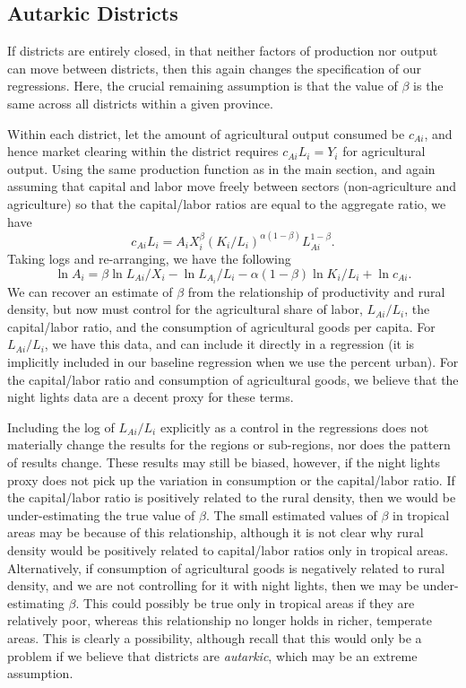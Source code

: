 \documentclass[11pt]{article}
\begin{document}
\subsection{Autarkic Districts}
If districts are entirely closed, in that neither factors of production nor output can move between districts, then this again changes the specification of our regressions. Here, the crucial remaining assumption is that the value of $\beta$ is the same across all districts within a given province. 

Within each district, let the amount of agricultural output consumed be $c_{Ai}$, and hence market clearing within the district requires $c_{Ai} L_i = Y_i$ for agricultural output. Using the same production function as in the main section, and again assuming that capital and labor move freely between sectors (non-agriculture and agriculture) so that the capital/labor ratios are equal to the aggregate ratio, we have
\begin{equation}
	c_{Ai} L_i = A_i X_i^{\beta} \left(K_i/L_i\right)^{\alpha(1-\beta)} L_{Ai}^{1-\beta}. \nonumber
\end{equation}
Taking logs and re-arranging, we have the following
\begin{equation}
	\ln A_i = \beta \ln L_{Ai}/X_i - \ln L_{A_i}/L_i - \alpha(1-\beta) \ln K_{i}/L_{i} + \ln c_{Ai}. \nonumber
\end{equation}
We can recover an estimate of $\beta$ from the relationship of productivity and rural density, but now must control for the agricultural share of labor, $L_{Ai}/L_i$, the capital/labor ratio, and the consumption of agricultural goods per capita. For $L_{Ai}/L_i$, we have this data, and can include it directly in a regression (it is implicitly included in our baseline regression when we use the percent urban). For the capital/labor ratio and consumption of agricultural goods, we believe that the night lights data are a decent proxy for these terms.

Including the log of $L_{Ai}/L_i$ explicitly as a control in the regressions does not materially change the results for the regions or sub-regions, nor does the pattern of results change. These results may still be biased, however, if the night lights proxy does not pick up the variation in consumption or the capital/labor ratio. If the capital/labor ratio is positively related to the rural density, then we would be under-estimating the true value of $\beta$. The small estimated values of $\beta$ in tropical areas may be because of this relationship, although it is not clear why rural density would be positively related to capital/labor ratios only in tropical areas. Alternatively, if consumption of agricultural goods is negatively related to rural density, and we are not controlling for it with night lights, then we may be under-estimating $\beta$. This could possibly be true only in tropical areas if they are relatively poor, whereas this relationship no longer holds in richer, temperate areas. This is clearly a possibility, although recall that this would only be a problem if we believe that districts are \textit{autarkic}, which may be an extreme assumption.
\end{document}
